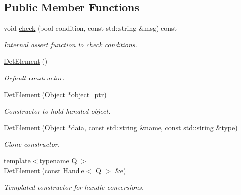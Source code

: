 \subsection*{Public Member Functions}
\begin{DoxyCompactItemize}
\item 
void \hyperlink{class_d_d4hep_1_1_geometry_1_1_det_element_a918c9ab5a3c4ba94c2b7ad97de67e5de}{check} (bool condition, const std::string \&msg) const 
\begin{DoxyCompactList}\small\item\em Internal assert function to check conditions. \item\end{DoxyCompactList}\item 
\hyperlink{class_d_d4hep_1_1_geometry_1_1_det_element_a005be4fc3aa34d82ee55af3f9bb78e47}{DetElement} ()
\begin{DoxyCompactList}\small\item\em Default constructor. \item\end{DoxyCompactList}\item 
\hyperlink{class_d_d4hep_1_1_geometry_1_1_det_element_a8f0fb6554c6b1589e6e44d879735e269}{DetElement} (\hyperlink{class_d_d4hep_1_1_geometry_1_1_det_element_object}{Object} $\ast$object\_\-ptr)
\begin{DoxyCompactList}\small\item\em Constructor to hold handled object. \item\end{DoxyCompactList}\item 
\hyperlink{class_d_d4hep_1_1_geometry_1_1_det_element_ac7ddea123648d4b336e63c7e0ae7106c}{DetElement} (\hyperlink{class_d_d4hep_1_1_geometry_1_1_det_element_object}{Object} $\ast$data, const std::string \&name, const std::string \&type)
\begin{DoxyCompactList}\small\item\em Clone constructor. \item\end{DoxyCompactList}\item 
{\footnotesize template$<$typename Q $>$ }\\\hyperlink{class_d_d4hep_1_1_geometry_1_1_det_element_a1083c73c02ad2cf66857c01ccaee507d}{DetElement} (const \hyperlink{class_d_d4hep_1_1_handle}{Handle}$<$ Q $>$ \&e)
\begin{DoxyCompactList}\small\item\em Templated constructor for handle conversions. \item\end{DoxyCompactList}\item 

\end{DoxyCompactItemize}
